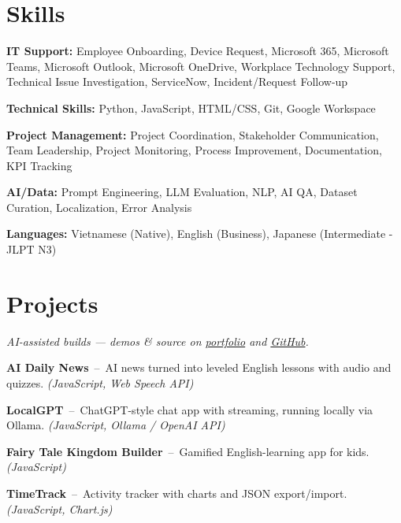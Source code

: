 \documentclass[letterpaper,10pt]{article}
\newenvironment{resume_list}{
  \vspace{-7pt}
  \begin{itemize}[itemsep=-2px, parsep=1pt, leftmargin=30pt]
}{
  \end{itemize}
}
\begin{document}
  \section{Skills}
    \begin{resume_list}
      \item \textbf{IT Support:} Employee Onboarding, Device Request, Microsoft 365, Microsoft Teams, Microsoft Outlook, Microsoft OneDrive, Workplace Technology Support, Technical Issue Investigation, ServiceNow, Incident/Request Follow-up\\ 
      \item \textbf{Technical Skills:} Python, JavaScript, HTML/CSS, Git, Google Workspace\\ 
      \item \textbf{Project Management:} Project Coordination, Stakeholder Communication, Team Leadership, Project Monitoring, Process Improvement, Documentation, KPI Tracking\\ 
      \item \textbf{AI/Data:} Prompt Engineering, LLM Evaluation, NLP, AI QA, Dataset Curation, Localization, Error Analysis\\ 
      \item \textbf{Languages:} Vietnamese (Native), English (Business), Japanese (Intermediate - JLPT N3)
    \end{resume_list}


  \section{Projects}
  \vspace{3pt}
  {\textit{AI-assisted builds --- demos \& source on \href{https://hangnghiem.github.io/nghiemhang/}{portfolio} and \href{https://github.com/hangnghiem}{GitHub}.}}\\
  \vspace{-3pt}
  \begin{resume_list}
    \item \textbf{AI Daily News} \,--\, AI news turned into leveled English lessons with audio and quizzes. \textit{(JavaScript, Web Speech API)}
    \item \textbf{LocalGPT} \,--\, ChatGPT-style chat app with streaming, running locally via Ollama. \textit{(JavaScript, Ollama / OpenAI API)}
    \item \textbf{Fairy Tale Kingdom Builder} \,--\, Gamified English-learning app for kids. \textit{(JavaScript)}
    \item \textbf{TimeTrack} \,--\, Activity tracker with charts and JSON export/import. \textit{(JavaScript, Chart.js)}
  \end{resume_list}
\end{document}
